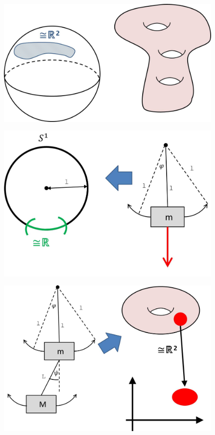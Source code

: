 \documentclass[a4paper,11pt,notitlepage]{report}
\theoremstyle{definition}
\begin{document}
\begin{figure}[h]

\begin{minipage}[b]{7cm}{\includegraphics[scale=0.3]{images/Mannigfaltigkeiten1.jpg}}\end{minipage}
\begin{minipage}[b]{7cm}{\includegraphics[scale=0.4]{images/S1_Pendel.jpg}}\end{minipage}
\newline
\begin{minipage}[b]{10cm}{\includegraphics[scale=0.4]{images/Torus_Doppelpendel.jpg}}\end{minipage}

\end{figure}
\end{document}
